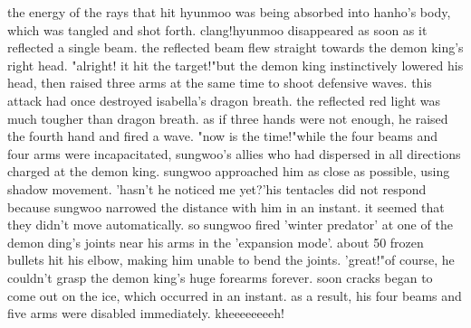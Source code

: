the energy of the rays that hit hyunmoo was being absorbed into hanho's body, which was tangled and shot forth.
clang!hyunmoo disappeared as soon as it reflected a single beam.
 the reflected beam flew straight towards the demon king's right head.
"alright! it hit the target!"but the demon king instinctively lowered his head, then raised three arms at the same time to shoot defensive waves.
 this attack had once destroyed isabella's dragon breath.
the reflected red light was much tougher than dragon breath.
 as if three hands were not enough, he raised the fourth hand and fired a wave.
"now is the time!"while the four beams and four arms were incapacitated, sungwoo's allies who had dispersed in all directions charged at the demon king.
 sungwoo approached him as close as possible, using shadow movement.
'hasn't he noticed me yet?'his tentacles did not respond because sungwoo narrowed the distance with him in an instant.
 it seemed that they didn't move automatically.
 so sungwoo fired 'winter predator' at one of the demon ding's joints near his arms in the 'expansion mode'.
about 50 frozen bullets hit his elbow, making him unable to bend the joints.
'great!"of course, he couldn't grasp the demon king's huge forearms forever.
 soon cracks began to come out on the ice, which occurred in an instant.
 as a result, his four beams and five arms were disabled immediately.
kheeeeeeeeh!

 